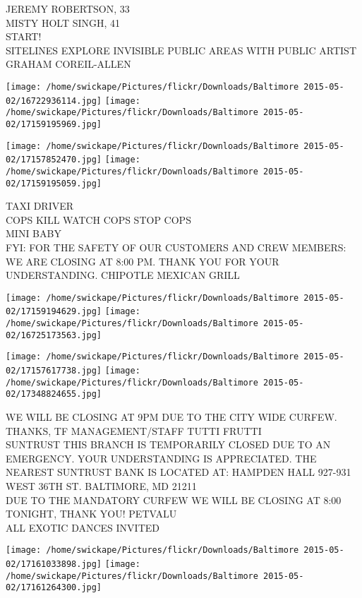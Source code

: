 \documentclass[10pt,letterpaper]{article}
\begin{document}
JEREMY ROBERTSON, 33\\
MISTY HOLT SINGH, 41\\
START!\\
SITELINES EXPLORE INVISIBLE PUBLIC AREAS WITH PUBLIC ARTIST GRAHAM COREIL{-}ALLEN\\
\pagebreak

\texttt{[image: /home/swickape/Pictures/flickr/Downloads/Baltimore 2015-05-02/16722936114.jpg]}
\texttt{[image: /home/swickape/Pictures/flickr/Downloads/Baltimore 2015-05-02/17159195969.jpg]}

\texttt{[image: /home/swickape/Pictures/flickr/Downloads/Baltimore 2015-05-02/17157852470.jpg]}
\texttt{[image: /home/swickape/Pictures/flickr/Downloads/Baltimore 2015-05-02/17159195059.jpg]}

TAXI DRIVER\\
COPS KILL WATCH COPS STOP COPS\\
MINI BABY\\
FYI: FOR THE SAFETY OF OUR CUSTOMERS AND CREW MEMBERS: WE ARE CLOSING AT 8:00 PM.  THANK YOU FOR YOUR UNDERSTANDING.  CHIPOTLE MEXICAN GRILL\\
\pagebreak

\texttt{[image: /home/swickape/Pictures/flickr/Downloads/Baltimore 2015-05-02/17159194629.jpg]}
\texttt{[image: /home/swickape/Pictures/flickr/Downloads/Baltimore 2015-05-02/16725173563.jpg]}

\texttt{[image: /home/swickape/Pictures/flickr/Downloads/Baltimore 2015-05-02/17157617738.jpg]}
\texttt{[image: /home/swickape/Pictures/flickr/Downloads/Baltimore 2015-05-02/17348824655.jpg]}

WE WILL BE CLOSING AT 9PM DUE TO THE CITY WIDE CURFEW.  THANKS, TF MANAGEMENT/STAFF  TUTTI FRUTTI\\
SUNTRUST THIS BRANCH IS TEMPORARILY CLOSED DUE TO AN EMERGENCY.  YOUR UNDERSTANDING IS APPRECIATED.  THE NEAREST SUNTRUST BANK IS LOCATED AT: HAMPDEN HALL 927{-}931 WEST 36TH ST. BALTIMORE, MD 21211\\
DUE TO THE MANDATORY CURFEW WE WILL BE CLOSING AT 8:00 TONIGHT, THANK YOU!  PETVALU\\
ALL EXOTIC DANCES INVITED\\
\pagebreak

\texttt{[image: /home/swickape/Pictures/flickr/Downloads/Baltimore 2015-05-02/17161033898.jpg]}
\texttt{[image: /home/swickape/Pictures/flickr/Downloads/Baltimore 2015-05-02/17161264300.jpg]}
\end{document}
